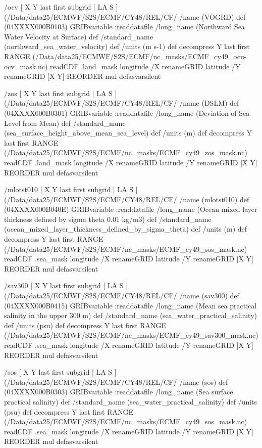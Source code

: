\begin{ingrid}
/ocv { [ X Y last first subgrid | LA S ] (/Data/data25/ECMWF/S2S/ECMF/CY48/REL/CF/%
/name (VOGRD) def
(04XXXX000B0103) GRIBvariable
:readdatafile
/long_name (Northward Sea Water Velocity at Surface) def
/standard_name (northward_sea_water_velocity) def
/units (m s-1) def
decompress
 Y last first RANGE
 (/Data/data25/ECMWF/S2S/ECMF/nc_masks/ECMF_cy49_ocu-ocv_mask.nc) readCDF .land_mask
   longitude /X renameGRID
   latitude /Y renameGRID
   [X Y] REORDER
mul
} defasvarsilent

/zos { [ X Y last first subgrid | LA S ] (/Data/data25/ECMWF/S2S/ECMF/CY48/REL/CF/%
/name (DSLM) def
(04XXXX000B0301) GRIBvariable
:readdatafile
/long_name (Deviation of Sea Level from Mean) def
/standard_name (sea_surface_height_above_mean_sea_level) def
/units (m) def
decompress
Y last first RANGE
 (/Data/data25/ECMWF/S2S/ECMF/nc_masks/ECMF_cy49_zos_mask.nc) readCDF .land_mask
   longitude /X renameGRID
   latitude /Y renameGRID
   [X Y] REORDER
mul
} defasvarsilent


/mlotst010 { [ X Y last first subgrid | LA S ] (/Data/data25/ECMWF/S2S/ECMF/CY48/REL/CF/%
/name (mlotst010) def
(04XXXX000B040E) GRIBvariable
:readdatafile
/long_name (Ocean mixed layer thickness defined by sigma theta 0.01 kg/m3) def
/standard_name (ocean_mixed_layer_thickness_defined_by_sigma_theta) def
/units (m) def
decompress
 Y last first RANGE
 (/Data/data25/ECMWF/S2S/ECMF/nc_masks/ECMF_cy49_sos_mask.nc) readCDF .sea_mask
   longitude /X renameGRID
   latitude /Y renameGRID
   [X Y] REORDER
mul
} defasvarsilent

/sav300 { [ X Y last first subgrid | LA S ] (/Data/data25/ECMWF/S2S/ECMF/CY48/REL/CF/%
/name (sav300) def
(04XXXX000B0415) GRIBvariable
:readdatafile
/long_name (Mean sea practical salinity in the upper 300 m) def
/standard_name (sea_water_practical_salinity) def
/units (psu) def
decompress
 Y last first RANGE
 (/Data/data25/ECMWF/S2S/ECMF/nc_masks/ECMF_cy49_sav300_mask.nc) readCDF .sea_mask
   longitude /X renameGRID
   latitude /Y renameGRID
   [X Y] REORDER
mul
} defasvarsilent

/sos { [ X Y last first subgrid | LA S ] (/Data/data25/ECMWF/S2S/ECMF/CY48/REL/CF/%
/name (sos) def
(04XXXX000B0303) GRIBvariable
:readdatafile
/long_name (Sea surface practical salinity) def
/standard_name (sea_water_practical_salinity) def
/units (psu) def
decompress
 Y last first RANGE
 (/Data/data25/ECMWF/S2S/ECMF/nc_masks/ECMF_cy49_sos_mask.nc) readCDF .sea_mask
   longitude /X renameGRID
   latitude /Y renameGRID
   [X Y] REORDER
mul
} defasvarsilent



\end{ingrid}
